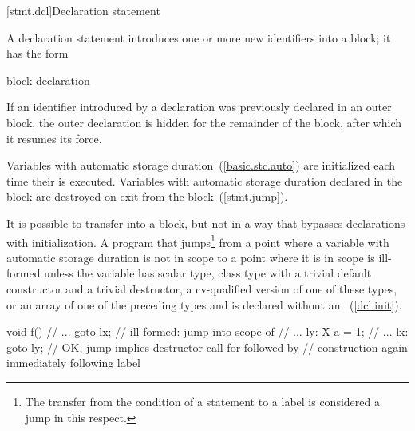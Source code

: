[stmt.dcl]{Declaration statement}%

\pnum
A declaration statement introduces one or more new identifiers into a
block; it has the form

\begin{bnf}
\br
    block-declaration
\end{bnf}

If an identifier introduced by a declaration was previously declared in
an outer block,
%
%
%
the outer declaration is hidden for the remainder of the block, after
which it resumes its force.

\pnum
{}%
%
Variables with automatic storage duration~(\ref{basic.stc.auto}) are
initialized each time their  is executed.
%
Variables with automatic storage duration declared in the block are
destroyed on exit from the block~(\ref{stmt.jump}).

\pnum
{}%
%
It is possible to transfer into a block, but not in a way that bypasses
declarations with initialization. A program that jumps\footnote{The transfer from the condition of a  statement to a
 label is considered a jump in this respect.}
from a point where a variable with automatic storage duration is
not in scope to a point where it is in scope is ill-formed unless the
variable has scalar type, class type with a trivial default constructor and a trivial destructor, a cv-qualified version of one of these types, or an array of one of the preceding types and is declared without an
~(\ref{dcl.init}).
\begin{example}

\begin{codeblock}
void f() {
  // ...
  goto lx;          // ill-formed: jump into scope of 
  // ...
ly:
  X a = 1;
  // ...
lx:
  goto ly;          // OK, jump implies destructor call for  followed by
                    // construction again immediately following label 
}
\end{codeblock}
\end{example}

